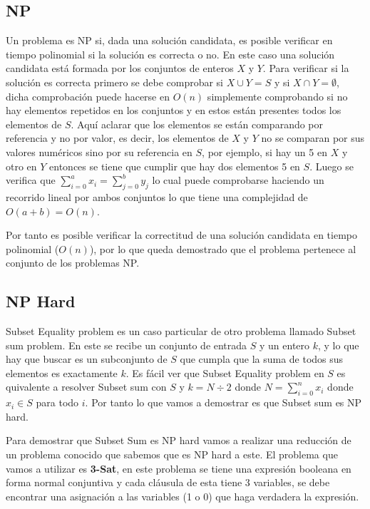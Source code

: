 \documentclass[11pt]{article}
\begin{document}
    \subsection{NP}
    Un problema es NP si, dada una solución candidata, es posible verificar en tiempo polinomial si la solución
    es correcta o no. En este caso una solución candidata está formada por los conjuntos de enteros
    $X$ y $Y$. Para verificar si la solución es correcta primero se debe comprobar si $X \cup Y = S$ y si
    $X \cap Y = \emptyset$, dicha comprobación puede hacerse en $O(n)$ simplemente comprobando si no hay elementos
    repetidos en los conjuntos y en estos están presentes todos los elementos de $S$. Aquí aclarar que los elementos
    se están comparando por referencia y no por valor, es decir, los elementos de $X$ y $Y$ no se comparan por sus 
    valores numéricos sino por su referencia en $S$, por ejemplo, si hay un 5 en $X$ y otro en $Y$ entonces 
    se tiene que cumplir que hay dos elementos 5 en $S$. Luego se verifica que $\sum_{i=0}^{a} x_i = \sum_{j=0}^b y_j$ 
    lo cual puede comprobarse haciendo un recorrido lineal por ambos conjuntos lo que tiene una complejidad de 
    $O(a+b) = O(n)$.

    Por tanto es posible verificar la correctitud de una solución candidata en tiempo polinomial ($O(n)$), por
    lo que queda demostrado que el problema pertenece al conjunto de los problemas NP.

    \subsection{NP Hard}
    Subset Equality problem es un caso particular de otro problema llamado Subset sum problem. En este se recibe un
    conjunto de entrada $S$ y un entero $k$, y lo que hay que buscar es un subconjunto de $S$ que cumpla que la suma 
    de todos sus elementos es exactamente $k$. Es fácil ver que Subset Equality problem en $S$ es quivalente a resolver 
    Subset sum con $S$ y $k = N \div 2$ donde $N = \sum_{i=0}^{n}x_i$ donde $x_i \in S$ para todo $i$. Por tanto lo que
    vamos a demostrar es que Subset sum es NP hard.
    
    Para demostrar que Subset Sum es NP hard vamos a realizar una reducción de un problema conocido que sabemos
    que es NP hard a este. El problema que vamos a utilizar es \textbf{3-Sat}, en este problema se tiene una expresión
    booleana en forma normal conjuntiva y cada cláusula de esta tiene 3 variables, se debe encontrar una asignación 
    a las variables (1 o 0) que haga verdadera la expresión.
\end{document}
